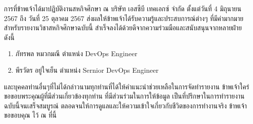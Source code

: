 \begin{acknowledgments}
    การที่ข้าพเจ้าได้มาปฏิบัติงานสหกิจศึกษา ณ บริษัท เอสซีบี เทคเอกซ์ จำกัด  ตั้งแต่วันที่ 4 มิถุนายน 2567  ถึง วันที่  25 ตุลาคม 2567  ส่งผลให้ข้าพเจ้าได้รับความรู้และประสบการณ์ต่างๆ ที่มีค่ามากมาย สำหรับรายงานวิชาสหกิจศึกษาฉบับนี้  สำเร็จลงได้ด้วยดีจากความร่วมมือและสนับสนุนจากหลายฝ่าย  ดังนี้
    \begin{enumerate}
        \item ภัทรพล หมวกมณี ตำแหน่ง DevOps Engineer
        \item พีรวัตร อยู่ใจเย็น ตำแหน่ง Sernior DevOps Engineer
    \end{enumerate}
    และบุคคลท่านอื่นๆที่ไม่ได้กล่าวนามทุกท่านที่ได้ให้คำแนะนำช่วยเหลือในการจัดทำรายงาน
	ข้าพเจ้าใคร่ขอขอบพระคุณผู้ที่มีส่วนเกี่ยวข้องทุกท่าน ที่มีส่วนร่วมในการให้ข้อมูล เป็นที่ปรึกษาในการทำรายงานฉบับนี้จนเสร็จสมบูรณ์ ตลอดจนให้การดูแลและให้ความเข้าใจเกี่ยวกับชีวิตของการทำงานจริง ข้าพเจ้าขอขอบคุณ ไว้ ณ ที่นี้
\end{acknowledgments}%
\fi %

\contentspage %

\ifproject
\tablelistpage
\figurelistpage

\fi %



